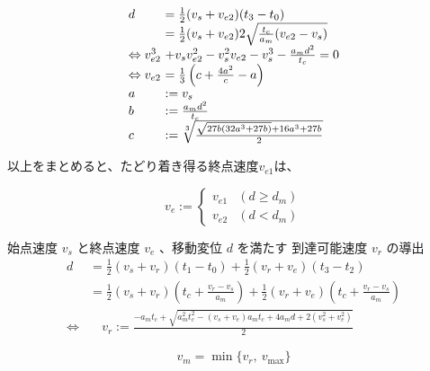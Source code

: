 \documentclass[a5paper]{ltjsarticle}
\begin{document}
$$
    \begin{array}{l@{~}l}
        d        & =                                                         \frac{1}{2}(v_s+v_{e2})(t_3-t_0)
        \\
                 & =                                                         \frac{1}{2}(v_s+v_{e2})2\sqrt{\frac{t_c}{a_m}(v_{e2}-v_s)}
        \\
        \Leftrightarrow
        v_{e2}^3 & + v_s v_{e2}^2-v_s^2v_{e2}-v_s^3-\frac{a_md^2}{t_c} = 0
        \\
        \Leftrightarrow
        v_{e2}   & =
        \frac{1}{3}\left(c +\frac{4a^2}{c}
        -a
        \right)
        \\
        a        & := v_s
        \\
        b        & :=                                                        \frac{a_md^2}{t_c}
        \\
        c        & :=                                                        \sqrt[3]{\frac{\sqrt{27b(32a^3+27b)} + 16a^3+27b}{2}}
    \end{array}
$$

以上をまとめると、たどり着き得る終点速度$v_{e1}$は、

$$
    v_{e} :=
    \left\{\begin{array}{ll}
        v_{e1} & (d        \ge d_m) \\
        v_{e2} & (d < d_m)
    \end{array}\right.
$$

始点速度 $v_s$ と終点速度 $v_e$ 、移動変位 $d$ を満たす
到達可能速度 $v_r$ の導出
\begin{align}
    d               & =
    \frac{1}{2}(v_s+v_r)(t_1-t_0)+
    \frac{1}{2}(v_r+v_e)(t_3-t_2)
    \\
                    & =
    \frac{1}{2}(v_s+v_r)\left(t_c+\frac{v_r-v_s}{a_m}\right)+
    \frac{1}{2}(v_r+v_e)\left(t_c+\frac{v_r-v_s}{a_m}\right)
    \\
    \Leftrightarrow & \quad
    v_r := \frac{-a_mt_c + \sqrt{a_m^2t_c^2-(v_s+v_e)a_mt_c+4a_md+2(v_s^2+v_e^2)}}{2}
\end{align}

$$
    v_m = \min\{v_r,~v_{\max} \}
$$
\end{document}
